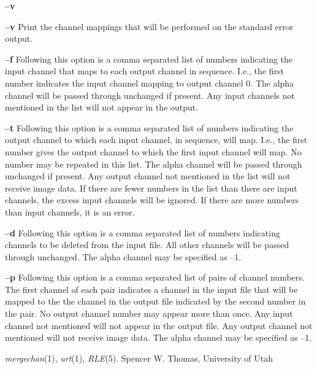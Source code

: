 \begin{TPlist}{{\bf --v}}
\item[{{\bf --v}}]
Print the channel mappings that will be performed on the standard
error output.
\item[{{\bf --f}}]
Following this option is
a comma separated list of numbers indicating the input channel that
maps to each output channel in sequence.  I.e., the first number
indicates the input channel mapping to output channel 0.  The alpha
channel will be passed through unchanged if present.  Any input
channels not mentioned in the list will not appear in the output.
\item[{{\bf --t}}]
Following this option is
a comma separated list of numbers indicating the output channel to
which each input channel, in sequence, will map.  I.e., the first
number gives the output channel to which the first input channel will
map.  No number may be repeated in this list.  The alpha channel will
be passed through unchanged if present.  Any output channel not
mentioned in the list will not receive image data.  If there are fewer
numbers in the list than there are input channels, the excess input
channels will be ignored.  If there are more numbers than input
channels, it is an error.
\item[{{\bf --d}}]
Following this option is a comma separated list of numbers indicating
channels to be deleted from the input file.  All other channels will
be passed through unchanged.  The alpha channel may be specified as --1.
\item[{{\bf --p}}]
Following this option is
a comma separated list of pairs of channel numbers.
The first channel of each pair indicates a channel
in the input file that will be mapped to the
the channel in the output file indicated by the
second number in the pair.  No output channel
number may appear more than once.  Any input channel
not mentioned will not appear in the output file.
Any output channel not mentioned will not receive
image data.  The alpha channel may be specified as --1.
\end{TPlist}
{\it mergechan}{\rm (1),}
{\it urt}{\rm (1),}
{\it RLE}{\rm (5).}
Spencer W. Thomas, University of Utah

\newpage


